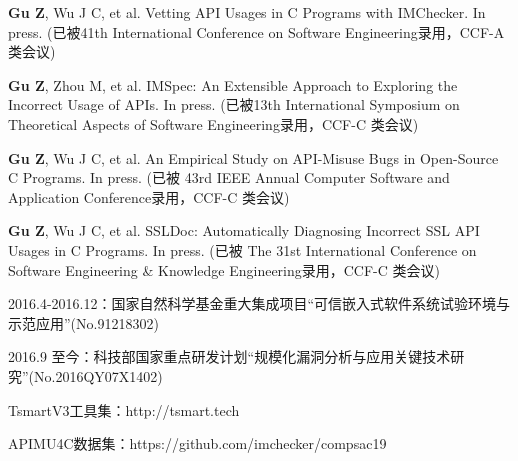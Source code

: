 \begin{resume}
  \begin{publications}[before=\publicationskip,after=\publicationskip]
    \item \textbf{Gu Z}, Wu J C, et al. Vetting API Usages in C Programs with IMChecker. In press. (已被41th International Conference on Software Engineering录用，CCF-A 类会议)
    \item \textbf{Gu Z}, Zhou M, et al. IMSpec: An Extensible Approach to Exploring the Incorrect Usage of APIs. In press. (已被13th International Symposium on Theoretical Aspects of Software Engineering录用，CCF-C 类会议)
    \item \textbf{Gu Z}, Wu J C, et al. An Empirical Study on API-Misuse Bugs in Open-Source C Programs. In press. (已被 43rd IEEE Annual Computer Software and Application Conference录用，CCF-C 类会议)
    \item \textbf{Gu Z}, Wu J C, et al. SSLDoc: Automatically Diagnosing Incorrect SSL API Usages in C Programs. In press. (已被 The 31st International Conference on Software Engineering \& Knowledge Engineering录用，CCF-C 类会议)
  \end{publications}


  \begin{achievements}
  	\item 2016.4-2016.12：国家自然科学基金重大集成项目“可信嵌入式软件系统试验环境与示范应用”(No.91218302)
  	\item 2016.9 至今：科技部国家重点研发计划“规模化漏洞分析与应用关键技术研究”(No.2016QY07X1402)
  	
  	
  \end{achievements}

  \begin{achievements}
    \item TsmartV3工具集：http://tsmart.tech
    \item APIMU4C数据集：https://github.com/imchecker/compsac19
  \end{achievements}

\end{resume}
